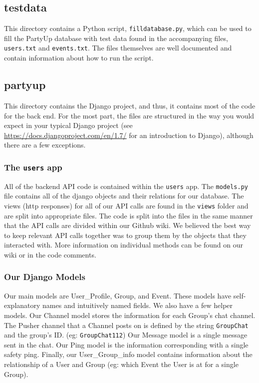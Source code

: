 \documentclass[12pt]{article}
\begin{document}
\subsection{testdata}

This directory contains a Python script, \texttt{filldatabase.py},
which can be used to fill the PartyUp database with test data
found in the accompanying files, \texttt{users.txt} and \texttt{events.txt}.
The files themselves are well documented and contain information about
how to run the script.

\subsection{partyup}

This directory contains the Django project, and thus,
it contains most of the code for the back end.
For the most part, the files are structured in the way you would
expect in your typical Django project
(see \url{https://docs.djangoproject.com/en/1.7/} for an introduction to Django),
although there are a few exceptions.

\subsubsection{The \texttt{users} app}

All of the backend API code is contained within the \texttt{users} app.
The \texttt{models.py} file contains all of the django objects and their relations for our database. 
The views (http responses) for all of our API calls are found in the \texttt{views} folder and are split into appropriate files.
The code is split into the files in the same manner that the API calls are divided within our Github wiki. 
We believed the best way to keep relevant API calls together was to group them by the objects that they interacted with. 
More information on individual methods can be found on our wiki or in the code comments.

\subsubsection{Our Django Models}

Our main models are User\_Profile, Group, and Event. 
These models have self-explanatory names and intuitively named fields. 
We also have a few helper models. 
Our Channel model stores the information for each Group's chat channel. 
The Pusher channel that a Channel posts on is defined by the string \texttt{GroupChat} and the group's ID. (eg: \texttt{GroupChat112}) 
Our Message model is a single message sent in the chat. 
Our Ping model is the information corresponding with a single safety ping. 
Finally, our User\_Group\_info model contains information about the relationship of a User and Group (eg: which Event the User is at for a single Group).
\end{document}
